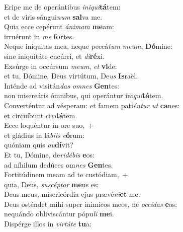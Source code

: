 \evenverse Eripe me de operántibus \textit{i}\textit{ni}\textit{qui}\textbf{tá}tem:~\*\\
\evenverse et de viris sángui\textit{num} \textbf{sal}va me.\\
\oddverse Quia ecce cepérunt \textit{á}\textit{ni}\textit{mam} \textbf{me}am:~\*\\
\oddverse irruérunt in \textit{me} \textbf{for}tes.\\
\evenverse Neque iníquitas mea, neque peccá\textit{tum} \textit{me}\textit{um}, \textbf{Dó}mine:~\*\\
\evenverse sine iniquitáte cucúrri, et \textit{di}\textbf{ré}xi.\\
\oddverse Exsúrge in occúrsum \textit{me}\textit{um}, \textit{et} \textbf{vi}de:~\*\\
\oddverse et tu, Dómine, Deus virtútum, De\textit{us} \textbf{Is}raël.\\
\evenverse Inténde ad visitán\textit{das} \textit{om}\textit{nes} \textbf{Gen}tes:~\*\\
\evenverse non misereáris ómnibus, qui operántur ini\textit{qui}\textbf{tá}tem.\\
\oddverse Converténtur ad vésperam: et famem pati\textit{én}\textit{tur} \textit{ut} \textbf{ca}nes:~\*\\
\oddverse et circuíbunt ci\textit{vi}\textbf{tá}tem.\\
\evenverse Ecce loquéntur in ore suo,~+\\
\evenverse  et gládius in lá\textit{bi}\textit{is} \textit{e}\textbf{ó}rum:~\*\\
\evenverse quóniam quis \textit{au}\textbf{dí}vit?\\
\oddverse Et tu, Dómine, de\textit{ri}\textit{dé}\textit{bis} \textbf{e}os:~\*\\
\oddverse ad níhilum dedúces om\textit{nes} \textbf{Gen}tes.\\
\evenverse Fortitúdinem meam ad te custódiam,~+\\
\evenverse  quia, Deus, \textit{su}\textit{scép}\textit{tor} \textbf{me}us es:~\*\\
\evenverse Deus meus, misericórdia ejus prævé\textit{ni}\textbf{et} me.\\
\oddverse Deus osténdet mihi super inimícos meos, ne \textit{oc}\textit{cí}\textit{das} \textbf{e}os:~\*\\
\oddverse nequándo obliviscántur pópu\textit{li} \textbf{me}i.\\
\evenverse Dispérge illos in \textit{vir}\textit{tú}\textit{te} \textbf{tu}a:~\*\\
